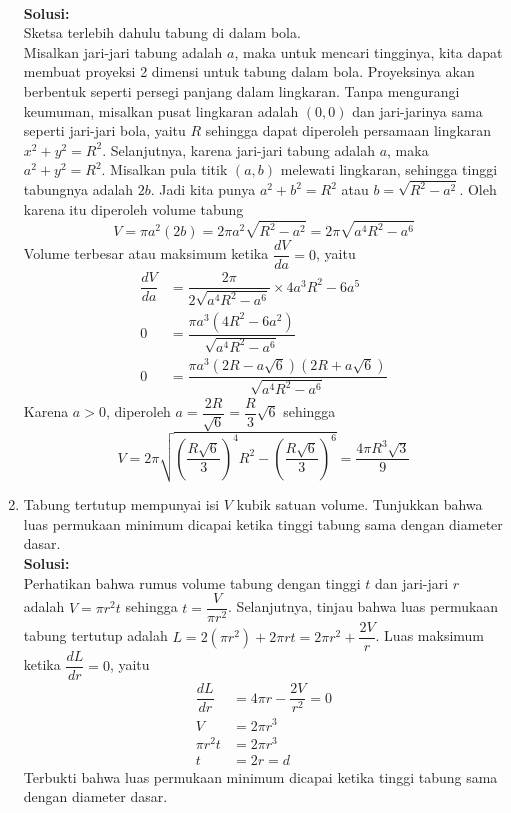 \documentclass{article}
\begin{document}
\begin{enumerate}
	\\[0.1 cm] \textbf{Solusi:}\\
	Sketsa terlebih dahulu tabung di dalam bola. \\
	Misalkan jari-jari tabung adalah $a$, maka untuk mencari tingginya, kita dapat membuat proyeksi 2 dimensi untuk tabung dalam bola. Proyeksinya akan berbentuk seperti persegi panjang dalam lingkaran. Tanpa mengurangi keumuman, misalkan pusat lingkaran adalah $(0,0)$ dan jari-jarinya sama seperti jari-jari bola, yaitu $R$ sehingga dapat diperoleh persamaan lingkaran $x^2+y^2=R^2$. Selanjutnya, karena jari-jari tabung adalah $a$, maka $a^2+y^2=R^2$. Misalkan pula titik $(a,b)$ melewati lingkaran, sehingga tinggi tabungnya adalah $2b$. Jadi kita punya $a^2+b^2=R^2$ atau $b=\sqrt{R^2-a^2}$. Oleh karena itu diperoleh volume tabung
	$$ V = \pi a^2(2b) = 2\pi a^2\sqrt{R^2-a^2} = 2\pi\sqrt{a^4R^2-a^6} $$
	 Volume terbesar atau maksimum ketika $\dfrac{dV}{da}=0$, yaitu
	 \begin{align*}
	 \dfrac{dV}{da} &= \dfrac{2\pi}{2\sqrt{a^4R^2-a^6}}\times 4a^3R^2-6a^5\\
	 0 &= \dfrac{\pi a^3(4R^2-6a^2)}{\sqrt{a^4R^2-a^6}}\\
	 0 &= \dfrac{\pi a^3(2R-a\sqrt{6})(2R+a\sqrt{6})}{\sqrt{a^4R^2-a^6}}
	 \end{align*}
	 Karena $a>0$, diperoleh $a=\dfrac{2R}{\sqrt{6}}=\dfrac{R}{3}\sqrt{6}$ sehingga 
	 $$ V=2\pi \sqrt{\left(\dfrac{R\sqrt{6}}{3}\right)^4R^2-\left(\dfrac{R\sqrt{6}}{3}\right)^6} = \dfrac{4\pi R^3\sqrt{3}}{9} $$
	 \item Tabung tertutup mempunyai isi $V$ kubik satuan volume. Tunjukkan bahwa luas permukaan minimum dicapai ketika tinggi tabung sama dengan diameter dasar.
	 \\[0.1 cm] \textbf{Solusi:} \\
	 Perhatikan bahwa rumus volume tabung dengan tinggi $t$ dan jari-jari $r$ adalah $V=\pi r^2t$ sehingga $t=\dfrac{V}{\pi r^2}$. Selanjutnya, tinjau bahwa luas permukaan tabung tertutup adalah $L=2(\pi r^2) + 2\pi rt=2\pi r^2+\dfrac{2V}{r}$. Luas maksimum ketika $\dfrac{dL}{dr}=0$, yaitu
	 \begin{align*}
	 \dfrac{dL}{dr} &= 4\pi r -\dfrac{2V}{r^2} = 0\\
	 V &= 2\pi r^3\\
	 \pi r^2t &= 2\pi r^3\\
	 t &= 2r = d
	 \end{align*}
	 Terbukti bahwa luas permukaan minimum dicapai ketika tinggi tabung sama dengan diameter dasar.

\end{enumerate}
\end{document}
